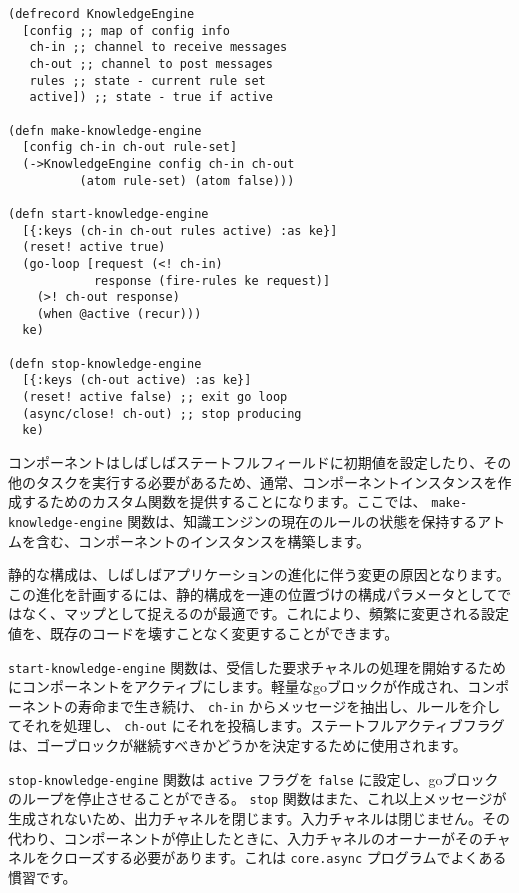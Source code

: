\begin{lstlisting}[numbers=none]
(defrecord KnowledgeEngine
  [config ;; map of config info
   ch-in ;; channel to receive messages
   ch-out ;; channel to post messages
   rules ;; state - current rule set
   active]) ;; state - true if active

(defn make-knowledge-engine
  [config ch-in ch-out rule-set]
  (->KnowledgeEngine config ch-in ch-out
          (atom rule-set) (atom false)))

(defn start-knowledge-engine
  [{:keys (ch-in ch-out rules active) :as ke}]
  (reset! active true)
  (go-loop [request (<! ch-in)
            response (fire-rules ke request)]
    (>! ch-out response)
    (when @active (recur)))
  ke)

(defn stop-knowledge-engine
  [{:keys (ch-out active) :as ke}]
  (reset! active false) ;; exit go loop
  (async/close! ch-out) ;; stop producing
  ke)
\end{lstlisting}

コンポーネントはしばしばステートフルフィールドに初期値を設定したり、その他のタスクを実行する必要があるため、通常、コンポーネントインスタンスを作成するためのカスタム関数を提供することになります。ここでは、 \texttt{make-knowledge-engine} 関数は、知識エンジンの現在のルールの状態を保持するアトムを含む、コンポーネントのインスタンスを構築します。

静的な構成は、しばしばアプリケーションの進化に伴う変更の原因となります。この進化を計画するには、静的構成を一連の位置づけの構成パラメータとしてではなく、マップとして捉えるのが最適です。これにより、頻繁に変更される設定値を、既存のコードを壊すことなく変更することができます。

\texttt{start-knowledge-engine} 関数は、受信した要求チャネルの処理を開始するためにコンポーネントをアクティブにします。軽量なgoブロックが作成され、コンポーネントの寿命まで生き続け、 \texttt{ch-in} からメッセージを抽出し、ルールを介してそれを処理し、 \texttt{ch-out} にそれを投稿します。ステートフルアクティブフラグは、ゴーブロックが継続すべきかどうかを決定するために使用されます。

\texttt{stop-knowledge-engine} 関数は \texttt{active} フラグを \texttt{false} に設定し、goブロックのループを停止させることができる。 \texttt{stop} 関数はまた、これ以上メッセージが生成されないため、出力チャネルを閉じます。入力チャネルは閉じません。その代わり、コンポーネントが停止したときに、入力チャネルのオーナーがそのチャネルをクローズする必要があります。これは \texttt{core.async} プログラムでよくある慣習です。




